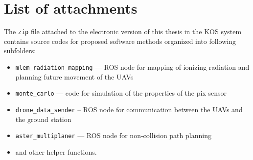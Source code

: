 \chapter{List of attachments}
The \verb|zip| file attached to the electronic version of this thesis in the KOS system contains source codes for proposed software methods organized into following subfolders:
\begin{itemize}
  \item \verb|mlem_radiation_mapping| --- \ac{ROS} node for mapping of ionizing radiation and planning future movement of the \acp{UAV}
  \item \verb|monte_carlo| --- code for simulation of the properties of the \ac{pix} sensor
  \item \verb|drone_data_sender| -- \ac{ROS} node for communication between the \acp{UAV} and the ground station
  \item \verb|aster_multiplaner| --- \ac{ROS} node for non-collision path planning
  \item and other helper functions.
\end{itemize}

